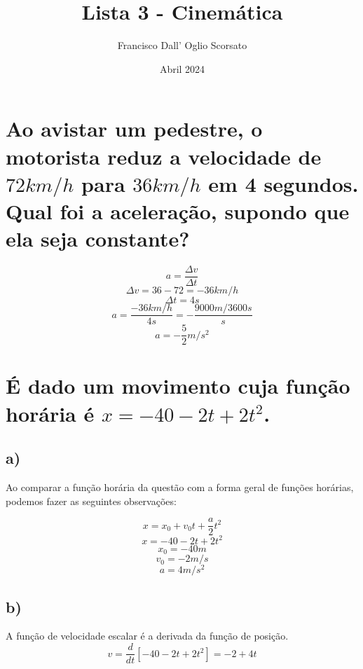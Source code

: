 \documentclass{article}
\title{Lista 3 - Cinemática}
\author{Francisco Dall' Oglio Scorsato}
\date{Abril 2024}
\begin{document}
\maketitle

\section{Ao avistar um pedestre, o motorista reduz a velocidade de \(72km/h\) para \(36km/h\) em 4 segundos. Qual foi a aceleração, supondo que ela seja constante?}

    \[a=\frac{\Delta v}{\Delta t}\]
    \[\Delta v=36-72=-36km/h\]
    \[\Delta t=4s\]
    \[a=\frac{-36km/h}{4s}=-\frac{9000m/3600s}{s}\]
    \[a=-\frac{5}{2}m/s^2\] 

\section{É dado um movimento cuja função horária é \(x=-40-2t+2t^2\).}


    \subsection{a)}
        \hspace{\parindent}Ao comparar a função horária da questão com a forma geral de funções horárias, podemos fazer as seguintes observações:
    
        \[x=x_0+v_0t+\frac{a}{2}t^2\]
        \[x=-40-2t+2t^2\]
        \[x_0=-40m\]
        \[v_0=-2m/s\]
        \[a=4m/s^2\]
    
    \subsection{b)}
        \hspace{\parindent}A função de velocidade escalar é a derivada da função de posição.
        \[v = \frac{d}{dt}[-40-2t+2t^2]=-2+4t\]
    
\end{document}
